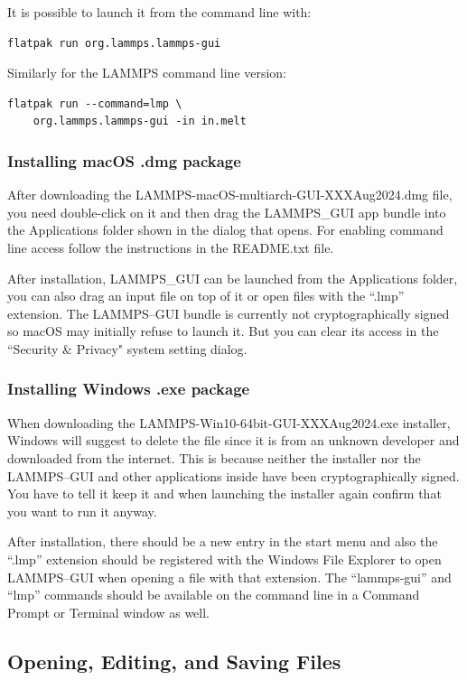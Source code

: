 \documentclass[9pt,tutorial]{livecoms}
\begin{document}
\begin{appendices}
It is possible to launch it from the command line with:
\begin{lstlisting}
flatpak run org.lammps.lammps-gui
\end{lstlisting}
Similarly for the LAMMPS command line version:
\begin{lstlisting}
flatpak run --command=lmp \
    org.lammps.lammps-gui -in in.melt
\end{lstlisting}

\subsubsection{Installing macOS .dmg package}

After downloading the LAMMPS-macOS-multiarch-GUI-XXXAug2024.dmg file,
you need double-click on it and then drag the LAMMPS\_GUI app bundle
into the Applications folder shown in the dialog that opens.  For
enabling command line access follow the instructions in the README.txt
file.

After installation, LAMMPS\_GUI can be launched from the Applications
folder, you can also drag an input file on top of it or open files with
the ``.lmp'' extension.  The LAMMPS--GUI bundle is currently not
cryptographically signed so macOS may initially refuse to launch it.
But you can clear its access in the ``Security \& Privacy" system
setting dialog.

\subsubsection{Installing Windows .exe package}

When downloading the LAMMPS-Win10-64bit-GUI-XXXAug2024.exe installer,
Windows will suggest to delete the file since it is from an unknown
developer and downloaded from the internet.  This is because neither the
installer nor the LAMMPS--GUI and other applications inside have been
cryptographically signed.  You have to tell it keep it and when
launching the installer again confirm that you want to run it anyway.

After installation, there should be a new entry in the start menu and
also the ``.lmp'' extension should be registered with the Windows File
Explorer to open LAMMPS--GUI when opening a file with that
extension. The ``lammps-gui'' and ``lmp'' commands should be available
on the command line in a Command Prompt or Terminal window as well.

\subsection{Opening, Editing, and Saving Files}


\end{appendices}
\end{document}

